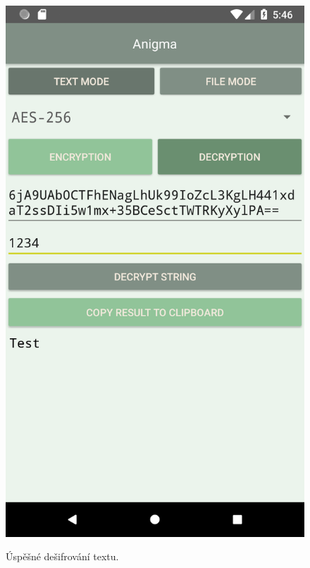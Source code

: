 \documentclass[12pt, a4paper]{article}
\begin{document}
\begin{figure}[h]
\caption{Úspěšné dešifrování textu.}
\centering
\includegraphics[height=0.4\textheight]{text_dec_success}
\label{fig:text_dec_success}
\end{figure}
\end{document}
